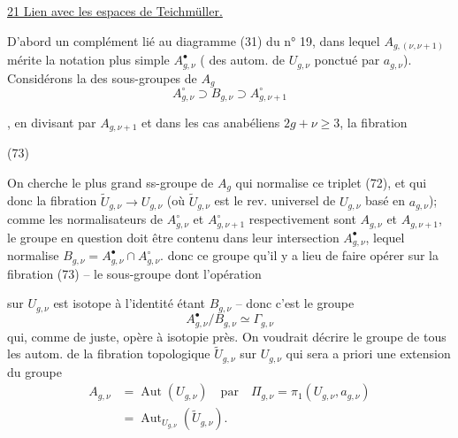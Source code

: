 
\uline{21 Lien avec les espaces de Teichmüller.}

D'abord un complément lié au diagramme  (31) du n° 19, dans lequel \(A_{g,(\nu,\nu+1)}\) mérite la notation plus simple \(A_{g,\nu}^{\bullet}\) ( des autom. de \(U_{g,\nu}\) ponctué par \(a_{g,\nu}\)). Considérons la  des sous-groupes de \(A_g\)
\[
 A_{g,\nu}^{\circ}\supset B_{g,\nu}\supset A_{g,\nu+1}^{\circ}
 \tag{72}
\]

, en divisant par \(A_{g,\nu+1}\) et dans les cas anabéliens \(2g+\nu\geq 3\), la fibration

(73) 

On cherche le plus grand ss-groupe de \(A_g\) qui normalise ce triplet (72), et qui   donc  la fibration \(\widetilde U_{g,\nu}\to U_{g,\nu}\) (où \(\widetilde U_{g,\nu}\) est le rev. universel de \(U_{g,\nu}\) basé en \(a_{g,\nu}\)); comme les normalisateurs de \(A_{g,\nu}^{\circ}\) et \(A_{g,\nu+1}^{\circ}\) respectivement sont \(A_{g,\nu}\) et \(A_{g,\nu+1}\), le groupe en question doit être contenu dans leur intersection \(A_{g,\nu}^{\bullet}\), lequel normalise  \(B_{g,\nu}=A_{g,\nu}^{\bullet}\cap A_{g,\nu}^{\circ}\).  donc ce groupe qu'il y a lieu de faire opérer sur la fibration (73) -- le sous-groupe   dont l'opération


sur \(U_{g,\nu}\) est isotope à l'identité étant  \(B_{g,\nu}\) -- donc c'est le groupe \unsure{\(\Gamma\)}
\[
 A_{g,\nu}^{\bullet}/B_{g,\nu}\simeq\Gamma_{g,\nu}
\]
qui, comme de juste, opère à isotopie près. On voudrait décrire le groupe de tous les autom. de la fibration topologique \(\widetilde U_{g,\nu}\) sur \(U_{g,\nu}\) qui sera a priori une extension du groupe
\[
 \begin{aligned}
 A_{g,\nu}&=\operatorname{Aut}(U_{g,\nu})\quad\text{par}\quad
 \Pi_{g,\nu}=\pi_1(U_{g,\nu},a_{g,\nu})\\
 &=\operatorname{Aut}_{U_{g,\nu}}(\widetilde U_{g,\nu}).
 \end{aligned}
\]


